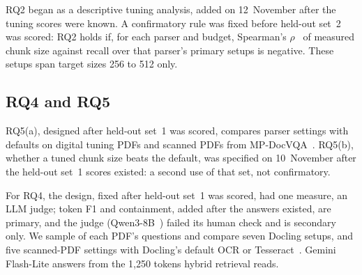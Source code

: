 RQ2 began as a descriptive tuning analysis, added on 12~November after the
tuning scores were known. A confirmatory rule was fixed before held-out set~2
was scored: RQ2 holds if, for each parser and budget, Spearman's
$\rho$~\cite{spearman} of measured chunk size against recall over that parser's
\RQtwoHTwoSetupsPerParser{} primary setups is negative. These setups span target
sizes 256 to 512 only.

\subsection{RQ4 and RQ5}\label{sec:aq}

RQ5(a), designed after held-out set~1 was scored, compares parser settings with defaults on digital tuning PDFs and scanned PDFs from
MP-DocVQA~\cite{tito2023mpdocvqa}. RQ5(b), whether a tuned chunk size beats the default, was specified on
10~November after the held-out set~1 scores existed: a second use of that set, not
confirmatory. 

For RQ4, the design, fixed after held-out set~1 was scored, had one
measure, an LLM judge; token F1 and
containment, added after the answers existed, are primary, and the judge (Qwen3-8B~\cite{qwen3}) failed its
human check and is secondary only. We sample \AQSampleShare{} of each PDF's questions and compare seven Docling
setups, and five scanned-PDF settings with Docling's default OCR or
Tesseract~\cite{tesseract}. Gemini Flash-Lite answers from the 1,250 tokens
hybrid retrieval reads.
